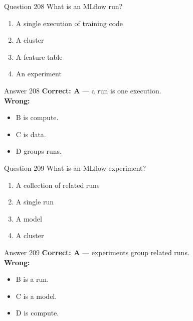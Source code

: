 \documentclass[aspectratio=169,11pt]{beamer}
\begin{document}
	\begin{frame}{Question 208}
		What is an MLflow run?
		\begin{enumerate}[label=\Alph*.]
			\item A single execution of training code
			\item A cluster
			\item A feature table
			\item An experiment
		\end{enumerate}
	\end{frame}
	\begin{frame}{Answer 208}
		\textbf{Correct: A} --- a run is one execution.\\
		\vspace{0.5em}
		\textbf{Wrong:}
		\begin{itemize}
			\item B is compute.
			\item C is data.
			\item D groups runs.
		\end{itemize}
	\end{frame}
	
	\begin{frame}{Question 209}
		What is an MLflow experiment?
		\begin{enumerate}[label=\Alph*.]
			\item A collection of related runs
			\item A single run
			\item A model
			\item A cluster
		\end{enumerate}
	\end{frame}
	\begin{frame}{Answer 209}
		\textbf{Correct: A} --- experiments group related runs.\\
		\vspace{0.5em}
		\textbf{Wrong:}
		\begin{itemize}
			\item B is a run.
			\item C is a model.
			\item D is compute.
		\end{itemize}
	\end{frame}
	
\end{document}
